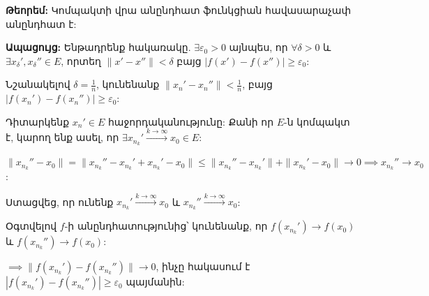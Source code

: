\documentclass[12pt, a4paper]{article}
\begin{document}
\textbf{Թեորեմ:} Կոմպակտի վրա անընդհատ ֆունկցիան հավասարաչափ անընդհատ է:

\textbf{Ապացույց:} Ենթադրենք հակառակը. $\exists \varepsilon_0 > 0$ այնպես, որ $\forall \delta > 0$ և $\exists x_\delta', x_\delta'' \in E$, որտեղ $\|x' - x''\| < \delta$ բայց $|f(x') - f(x'')| \ge \varepsilon_0$:

Նշանակելով $\delta = \frac{1}{n}$, կունենանք $\|x_n' - x_n''\| < \frac{1}{n}$, բայց $|f(x_n') - f(x_n'')| \ge \varepsilon_0$:

Դիտարկենք $x_n' \in E$ հաջորդականությունը: Քանի որ $E$-ն կոմպակտ է, կարող ենք ասել, որ $\exists x_{n_k}' \overset{k \to \infty}{\longrightarrow} x_0 \in E$:

$\|x_{n_k}'' - x_0\| = \|x_{n_k}'' - x_{n_k}' + x_{n_k}' - x_0\| \le \|x_{n_k}'' - x_{n_k}'\| + \|x_{n_k}' - x_0\| \to 0 \implies x_{n_k}'' \to x_0$:

Ստացվեց, որ ունենք $x_{n_k}' \overset{k \to \infty}{\longrightarrow} x_0$ և $x_{n_k}'' \overset{k \to \infty}{\longrightarrow} x_0$:

Օգտվելով $f$-ի անընդհատությունից՝ կունենանք, որ $f(x_{n_k}') \to f(x_0)$ և $f(x_{n_k}'') \to f(x_0)$:

$\implies \|f(x_{n_k}') - f(x_{n_k}'')\| \to 0$, ինչը հակասում է $|f(x_{n_k}') - f(x_{n_k}'')| \ge \varepsilon_0$ պայմանին:
\end{document}
